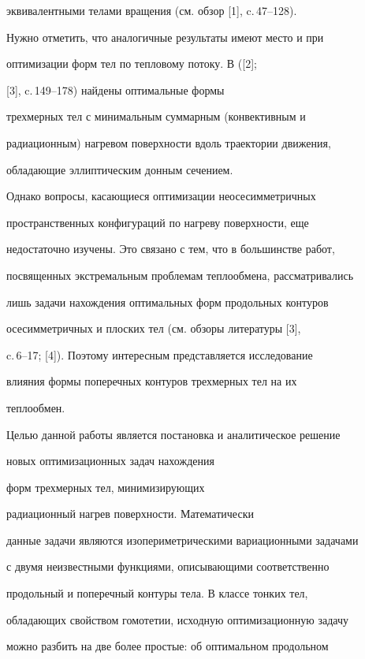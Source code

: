 эквивалентными телами вращения (см. обзор [1], c.\,47--128).





Нужно отметить, что аналогичные результаты имеют место и при


оптимизации форм тел по тепловому потоку. В ([2];


[3], c.\,149--178) найдены оптимальные формы


трехмерных тел с минимальным суммарным (конвективным и


радиационным) нагревом поверхности вдоль траектории движения,


обладающие эллиптическим донным сечением.





Однако вопросы, касающиеся оптимизации неосесимметричных


пространственных конфигураций по нагреву поверхности, еще


недостаточно изучены. Это связано с тем, что в большинстве работ,


посвященных экстремальным проблемам теплообмена, рассматривались


лишь задачи нахождения оптимальных форм продольных контуров


осесимметричных и плоских тел (см. обзоры литературы [3],


c.\,6--17; [4]). Поэтому интересным представляется исследование


влияния формы поперечных контуров трехмерных тел на их


теплообмен.





Целью данной работы является постановка и аналитическое решение


новых оптимизационных задач нахождения


форм трехмерных тел, минимизирующих


радиационный нагрев поверхности. Математически


данные задачи являются изопериметрическими вариационными задачами


с двумя неизвестными функциями, описывающими соответственно


продольный и поперечный контуры тела. В классе тонких тел,


обладающих свойством гомотетии, исходную оптимизационную задачу


можно разбить на две более простые: об оптимальном продольном


